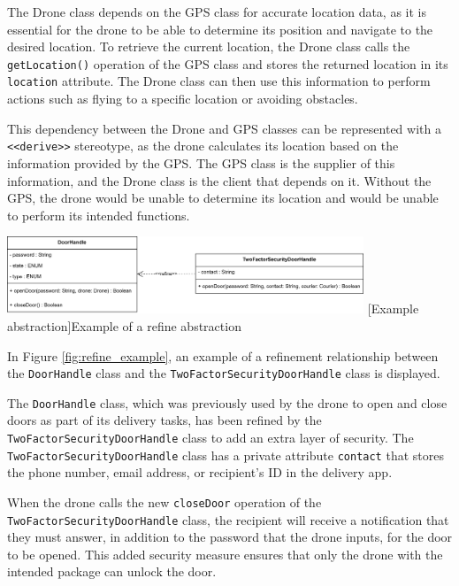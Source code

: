 \documentclass[
	12pt,
    a4paper,
    egregdoesnotlikesansseriftitles, %
    toc=chapterentrywithdots,
    oneside, openany,
    titlepage,
    parskip=half,
    headings=normal,  %
    listof=totoc,
    bibliography=totocnumbered,
    index=totoc,
    captions=tableheading,  %
    listof=flat,
    numbers=noenddot, %
    final]
    {scrbook}
\begin{document}
The Drone class depends on the GPS class for accurate location data, as it is essential for the drone to be able to determine its position and navigate to the desired location. To retrieve the current location, the Drone class calls the \texttt{getLocation()} operation of the GPS class and stores the returned location in its \texttt{location} attribute. The Drone class can then use this information to perform actions such as flying to a specific location or avoiding obstacles.

This dependency between the Drone and GPS classes can be represented with a \texttt{<<derive>>} stereotype, as the drone calculates its location based on the information provided by the GPS. 
The GPS class is the supplier of this information, and the Drone class is the client that depends on it. 
Without the GPS, the drone would be unable to determine its location and would be unable to perform its intended functions.



\vspace{1em}
\begin{minipage}{\linewidth}
	\centering
	\includegraphics[width=0.8\textwidth]{figures/dependencies/refine.jpg}
	[Example abstraction]{Example of a refine abstraction}
	\label{fig:refine_example}
\end{minipage}
\vspace{1em}

In Figure \ref{fig:refine_example}, an example of a refinement relationship between the \texttt{DoorHandle} class and the \texttt{TwoFactorSecurityDoorHandle} class is displayed.

The \texttt{DoorHandle} class, which was previously used by the drone to open and close doors as part of its delivery tasks, has been refined by the \texttt{TwoFactorSecurityDoorHandle} class to add an extra layer of security. The \texttt{TwoFactorSecurityDoorHandle} class has a private attribute \texttt{contact} that stores the phone number, email address, or recipient's ID in the delivery app.

When the drone calls the new \texttt{closeDoor} operation of the \texttt{TwoFactorSecurityDoorHandle} class, the recipient will receive a notification that they must answer, in addition to the password that the drone inputs, for the door to be opened. This added security measure ensures that only the drone with the intended package can unlock the door.
\end{document}
